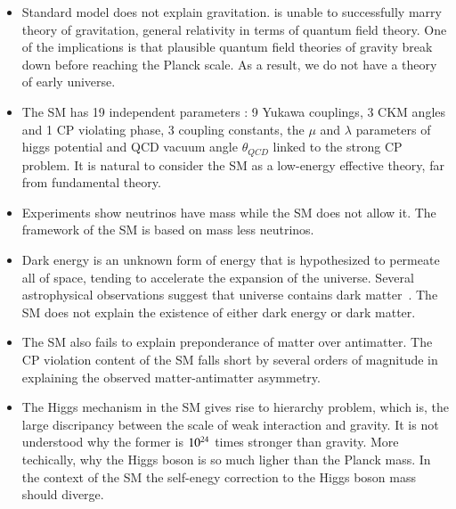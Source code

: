 \begin{itemize}



\item Standard model does not explain gravitation. is unable to successfully marry  theory of gravitation, general relativity in terms of quantum field theory. One of the implications is that plausible quantum field theories of gravity break down before reaching the Planck scale. As a result, we do not have a theory of early universe. 

\item The SM has 19 independent parameters : 9 Yukawa couplings, 3 CKM angles and 1 CP violating phase, 3 coupling constants, the $\mu$ and $\lambda$ parameters of higgs potential and QCD vacuum angle $\theta_{QCD}$ linked to the strong CP problem. It is natural to consider the SM as a low-energy effective theory, far from fundamental theory.

\item Experiments show neutrinos have mass while the SM does not allow it. The framework of the SM is based on mass less neutrinos.

\item Dark energy is an unknown form of energy that is hypothesized to permeate all of space, tending to accelerate the expansion of the universe. Several astrophysical observations suggest that universe contains dark matter~\cite{DarkMatter}. The SM does not explain the existence of either dark energy or dark matter.

\item The SM also fails to explain preponderance of matter over antimatter. The CP violation content of the SM falls short by several orders of magnitude in explaining the observed matter-antimatter asymmetry.

\item The Higgs mechanism in the SM gives rise to hierarchy problem, which is, the large discripancy between the scale of weak interaction and gravity. It is not understood why the former is $\rm 10^{24}$ times stronger than gravity. More techically, why the Higgs boson is so much ligher than the Planck mass. In the context of the SM the self-enegy correction to the Higgs boson mass should diverge.

\end{itemize}





%
